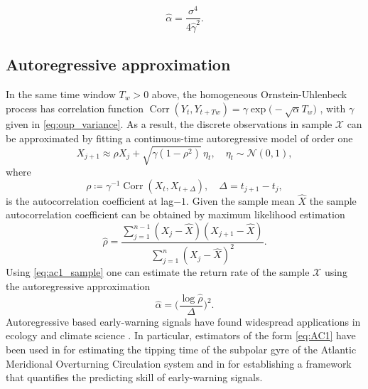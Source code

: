 \documentclass[11pt,a4paper]{article}
\theoremstyle{plain}
\theoremstyle{definition}
\theoremstyle{remark}
\newcommand{\Corr}{\operatorname{Corr}}
\begin{document}
\begin{equation}\label{eq:OUP}
        \hat\alpha = \frac{\sigma^4}{4\hat\gamma^2} .
\end{equation}

\subsection{Autoregressive approximation}\label{subsec:AC1}
In the same time window $T_w>0$ above, the homogeneous Ornstein-Uhlenbeck process has correlation function $\Corr(Y_t,Y_{t+Tw})=\gamma\exp\bigl(-\sqrt{\alpha}T_w\bigr)$ \cite[\S~$3.8$]{Gardiner2009}, with $\gamma$ given in \eqref{eq:oup_variance}.
As a result, the discrete observations in sample $\mathcal{X}$ can be approximated by fitting a continuous-time autoregressive model of order one
%
\begin{equation}\label{eq:autoregressive}
        X_{j+1}\approx\rho X_{j} + \sqrt{\gamma(1-\rho^2)}\,\eta_t , \quad \eta_t\sim\mathcal{N}(0,1),
\end{equation}
%
where 
%
\begin{equation}\label{eq:ac1}
        \rho\coloneqq\gamma^{-1}\Corr(X_t,X_{t+\Delta}), \quad \Delta=t_{j+1}-t_j, 
\end{equation}
%
is the autocorrelation coefficient at lag$-1$.
Given the sample mean $\hat X$ the sample autocorrelation coefficient can be obtained by maximum likelihood estimation
%
\begin{equation}\label{eq:ac1_sample}
        \hat\rho = \frac{\sum_{j=1}^{n-1}(X_j - \hat X)(X_{j+1} - \hat X)}{\sum_{j=1}^{n}(X_j - \hat X)^2}.
\end{equation}
%
Using \eqref{eq:ac1_sample} one can estimate the return rate of the sample $\mathcal{X}$ using the autoregressive approximation 
%
\begin{equation}\label{eq:AC1}
        \hat\alpha = \biggl(\frac{\log\hat\rho}{\Delta}\biggr)^2.
\end{equation}
%
Autoregressive based early-warning signals have found widespread applications in ecology \cite{Dakos2012} and climate science \cite{Boers2021}.
In particular, estimators of the form \eqref{eq:AC1} have been used in \cite{Ditlevsen2023} for estimating the tipping time of the subpolar gyre of the Atlantic Meridional Overturning Circulation system and in \cite{Ashwin2025} for establishing a framework that quantifies the predicting skill of early-warning signals.
\end{document}
